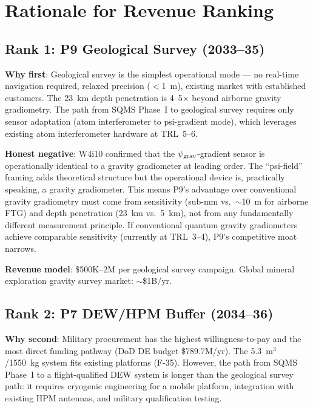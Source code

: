 \documentclass[11pt]{article}
\newcommand{\psigrav}{\psi_{\rm grav}}
\begin{document}
\section{Rationale for Revenue Ranking}
\label{sec:revenue-rationale}

\subsection{Rank 1: P9 Geological Survey (2033--35)}

\textbf{Why first}: Geological survey is the simplest operational mode
--- no real-time navigation required, relaxed precision ($<$1~m), existing
market with established customers. The 23~km depth penetration is
4--5$\times$ beyond airborne gravity gradiometry. The path from SQMS
Phase~I to geological survey requires only sensor adaptation (atom
interferometer to psi-gradient mode), which leverages existing
atom interferometer hardware at TRL~5--6.

\textbf{Honest negative}: W4i10 confirmed that the $\psigrav$-gradient
sensor is operationally identical to a gravity gradiometer at leading
order. The ``psi-field'' framing adds theoretical structure but the
operational device is, practically speaking, a gravity gradiometer.
This means P9's advantage over conventional gravity gradiometry must
come from sensitivity (sub-mm vs.\ $\sim$10~m for airborne FTG) and
depth penetration (23~km vs.\ 5~km), not from any fundamentally
different measurement principle. If conventional quantum gravity
gradiometers achieve comparable sensitivity (currently at TRL~3--4),
P9's competitive moat narrows.

\textbf{Revenue model}: \$500K--2M per geological survey campaign.
Global mineral exploration gravity survey market: $\sim$\$1B/yr.

\subsection{Rank 2: P7 DEW/HPM Buffer (2034--36)}

\textbf{Why second}: Military procurement has the highest willingness-to-pay
and the most direct funding pathway (DoD DE budget \$789.7M/yr). The
5.3~m$^3$/1550~kg system fits existing platforms (F-35). However, the path
from SQMS Phase~I to a flight-qualified DEW system is longer than the
geological survey path: it requires cryogenic engineering for a mobile
platform, integration with existing HPM antennas, and military
qualification testing.
\end{document}
